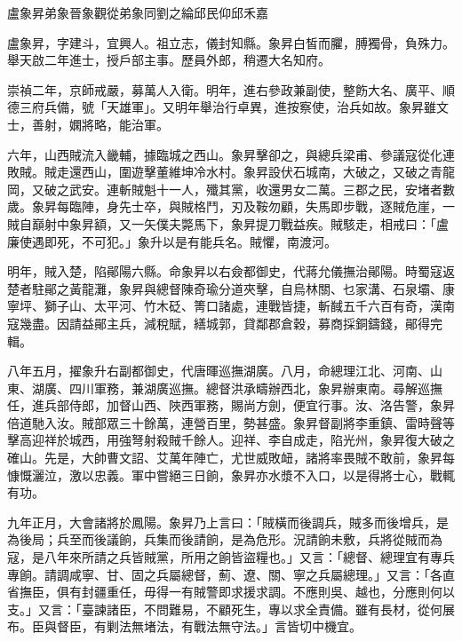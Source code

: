 
\begin{pinyinscope}
盧象昇弟象晉象觀從弟象同劉之綸邱民仰邱禾嘉

盧象昇，字建斗，宜興人。祖立志，儀封知縣。象昇白皙而臞，膊獨骨，負殊力。舉天啟二年進士，授戶部主事。歷員外郎，稍遷大名知府。

崇禎二年，京師戒嚴，募萬人入衛。明年，進右參政兼副使，整飭大名、廣平、順德三府兵備，號「天雄軍」。又明年舉治行卓異，進按察使，治兵如故。象昇雖文士，善射，嫻將略，能治軍。

六年，山西賊流入畿輔，據臨城之西山。象昇擊卻之，與總兵梁甫、參議寇從化連敗賊。賊走還西山，圍遊擊董維坤冷水村。象昇設伏石城南，大破之，又破之青龍岡，又破之武安。連斬賊魁十一人，殲其黨，收還男女二萬。三郡之民，安堵者數歲。象昇每臨陣，身先士卒，與賊格鬥，刃及鞍勿顧，失馬即步戰，逐賊危崖，一賊自巔射中象昇額，又一矢僕夫斃馬下，象昇提刀戰益疾。賊駭走，相戒曰：「盧廉使遇即死，不可犯。」象升以是有能兵名。賊懼，南渡河。

明年，賊入楚，陷鄖陽六縣。命象昇以右僉都御史，代蔣允儀撫治鄖陽。時蜀寇返楚者駐鄖之黃龍灘，象昇與總督陳奇瑜分道夾擊，自烏林關、乜家溝、石泉壩、康寧坪、獅子山、太平河、竹木砭、箐口諸處，連戰皆捷，斬馘五千六百有奇，漢南寇幾盡。因請益鄖主兵，減稅賦，繕城郭，貸鄰郡倉穀，募商採銅鑄錢，鄖得完輯。

八年五月，擢象升右副都御史，代唐暉巡撫湖廣。八月，命總理江北、河南、山東、湖廣、四川軍務，兼湖廣巡撫。總督洪承疇辦西北，象昇辦東南。尋解巡撫任，進兵部侍郎，加督山西、陜西軍務，賜尚方劍，便宜行事。汝、洛告警，象昇倍道馳入汝。賊部眾三十餘萬，連營百里，勢甚盛。象昇督副將李重鎮、雷時聲等擊高迎祥於城西，用強弩射殺賊千餘人。迎祥、李自成走，陷光州，象昇復大破之確山。先是，大帥曹文詔、艾萬年陣亡，尤世威敗衄，諸將率畏賊不敢前，象昇每慷慨灑泣，激以忠義。軍中嘗絕三日餉，象昇亦水漿不入口，以是得將士心，戰輒有功。

九年正月，大會諸將於鳳陽。象昇乃上言曰：「賊橫而後調兵，賊多而後增兵，是為後局；兵至而後議餉，兵集而後請餉，是為危形。況請餉未敷，兵將從賊而為寇，是八年來所請之兵皆賊黨，所用之餉皆盜糧也。」又言：「總督、總理宜有專兵專餉。請調咸寧、甘、固之兵屬總督，薊、遼、關、寧之兵屬總理。」又言：「各直省撫臣，俱有封疆重任，毋得一有賊警即求援求調。不應則吳、越也，分應則何以支。」又言：「臺諫諸臣，不問難易，不顧死生，專以求全責備。雖有長材，從何展布。臣與督臣，有剿法無堵法，有戰法無守法。」言皆切中機宜。


\end{pinyinscope}

